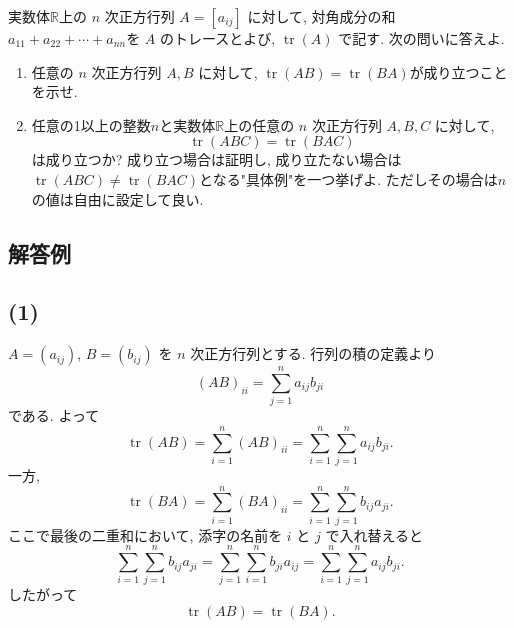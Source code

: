 \documentclass[uplatex,dvipdfmx,a4paper,14pt]{jsarticle}
\newcommand{\R}{\mathbb{R}}
\newcommand{\tr}{\operatorname{tr}}
\begin{document}
\begin{tcolorbox}[problemstyle,title=問題]

実数体$\R$上の \(n\) 次正方行列 \(A=[a_{ij}]\) に対して, 対角成分の和
\(
a_{11}+a_{22}+\cdots+a_{nn}
\)を \(A\) のトレースとよび, \(\operatorname{tr}(A)\) で記す.
次の問いに答えよ.
 \begin{enumerate}[label=(\arabic*)]
 \setlength{\parskip}{0cm}
  \setlength{\itemsep}{0cm}
  \item 任意の \(n\) 次正方行列 \(A,B\) に対して,
\(
\operatorname{tr}(AB)=\operatorname{tr}(BA)
\)が成り立つことを示せ.
\item
 任意の1以上の整数$n$と実数体$\R$上の任意の \(n\) 次正方行列 \(A,B ,C\) に対して,
\[
\operatorname{tr}(ABC)=\operatorname{tr}(BAC)
\]は成り立つか? 成り立つ場合は証明し, 成り立たない場合は$\operatorname{tr}(ABC)\neq \operatorname{tr}(BAC)$となる"具体例"を一つ挙げよ. ただしその場合は$n$の値は自由に設定して良い.
\end{enumerate}

\end{tcolorbox}

\subsection*{解答例}

\subsection*{(1)}
$A=(a_{ij})$, $B=(b_{ij})$ を $n$ 次正方行列とする. 行列の積の定義より
\[
(AB)_{ii}=\sum_{j=1}^n a_{ij}b_{ji}
\]
である. よって
\[
\tr(AB)=\sum_{i=1}^n (AB)_{ii}
=\sum_{i=1}^n\sum_{j=1}^n a_{ij}b_{ji}.
\]
一方,
\[
\tr(BA)=\sum_{i=1}^n(BA)_{ii}
=\sum_{i=1}^n\sum_{j=1}^n b_{ij}a_{ji}.
\]
ここで最後の二重和において, 添字の名前を $i$ と $j$ で入れ替えると
\[
\sum_{i=1}^n\sum_{j=1}^n b_{ij}a_{ji}
=\sum_{j=1}^n\sum_{i=1}^n b_{ji}a_{ij}
=\sum_{i=1}^n\sum_{j=1}^n a_{ij}b_{ji}.
\]
したがって
\[
\boxed{\tr(AB)=\tr(BA).}
\]
\end{document}
